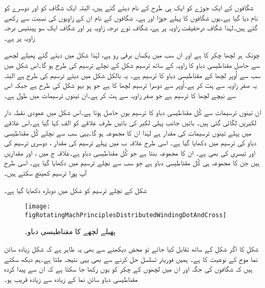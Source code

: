 شگافوں کے ایک جوڑے کو ایک ہی طرح کے نام دیئے گئے ہیں، البتہ ایک شگاف کو  اور دوسرے کو  نام دیا گیا ہے۔یوں شگافوں کا پہلے جوڑا   اور   ہے۔   شگافوں کے نام ان کے زاویوں کی نسبت سے رکھے گئے ہیں۔لہٰذا شگاف   درحقیقت  زاویہ پر ہے، شگاف  نوے درجہ زاویہ پر اور شگاف   ایک سو پینتیس درجہ زاویہ پر ہے۔

چونکہ ہر لچھا  چکر کا ہے اور ان سب میں یکساں برقی رو  ہے،  لہٰذا  شکل    میں دیئے گئے پھیلے لچھے سے حاصل مقناطیسی دباو کا زاویہ کے ساتھ ترسیم شکل   کے نچلے ترسیم کی طرح ہو گا۔اس شکل میں سب سے اُوپر لچھا    کے مقناطیسی دباو کا ترسیم ہے۔ یہ بالکل شکل   میں دیئے ترسیم کی طرح ہے البتہ یہ صفر زاویہ سے  ہٹ کر ہے۔اُوپر سے دوسرا ترسیم لچھا  کا ہے جو ہو بہو شکل  کی طرح ہے جبکہ اس سے نیچے لچھا  کا ترسیم ہے جو صفر زاویہ سے  ہٹ کر ہے۔ان تینوں ترسیمات میں طول  ہے۔

ان تینوں ترسیمات سے کُل مقناطیسی دباو کا ترسیم یوں حاصل ہوتا ہے۔اس شکل میں عمودی نقطہ دار لکیریں لگائی گئی ہیں۔ بائیں جانب پہلی لکیر کی بائیں طرف علاقے کو الف کہا گیا ہے۔اس علاقے میں پہلے تینوں ترسیمات کی مقدار  ہے لہٰذا ان کا مجموعہ  ہو گا۔یہی سب سے نچلے کُل مقناطیسی دباو کی ترسیم میں دکھایا گیا ہے۔ اسی طرح علاقہ ب میں پہلے ترسیم کی مقدار  ، دوسری ترسیم کی  اور تیسری کی بھی  ہے۔ ان کا مجموعہ  بنتا ہے جو کُل مقناطیسی دباو ہے۔علاقہ ج میں
 ،  اور  مقداریں ہیں جن کا مجموعہ  ہی کُل مقناطیسی دباو ہے جو سب سے نچلے ترسیم میں دکھایا گیا ہے۔ اسی طرح آپ پورا ترسیم کھینچ سکتے ہیں۔

شکل   کے نچلے ترسیم کو شکل   میں دوبارہ دکھایا گیا ہے۔
\begin{figure}
\centering
\texttt{[image: figRotatingMachPrinciplesDistributedWindingDotAndCross]}
\caption{پھیلے لچھے کا مقناطیسی دباو۔}
\label{شکل_گھومتے_مشین_پھیلے_لچھے_نقطہ_صلیب_پر_جمپ}
\end{figure}

شکل   کا اگر شکل   کے ساتھ تقابل کیا جائے تو محض دیکھنے سے بھی یہ
 ظاہر ہے کہ شکل    زیادہ سائن نما موج کے نوعیت کا ہے۔ ہمیں فوریئر تسلسل حل کرنے سے بھی یہی نتیجہ ملتا ہے۔ہم دیکھ سکتے ہیں کہ  شگافوں کی جگہ اور ان میں لچھوں کے چکر کو یوں رکھا جا سکتا ہے کہ ان سے پیدا کردہ مقناطیسی دباو سائن نما کے زیادہ سے زیادہ قریب ہو۔

